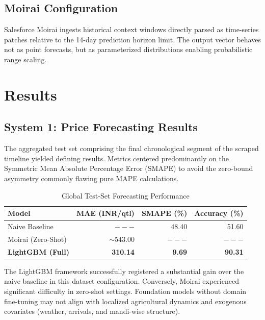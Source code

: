 \documentclass[conference]{IEEEtran}
\begin{document}
\subsection{Moirai Configuration}
Salesforce Moirai ingests historical context windows directly parsed as time-series patches relative to the 14-day prediction horizon limit. The output vector behaves not as point forecasts, but as parameterized distributions enabling probabilistic range scaling.

\section{Results}

\subsection{System 1: Price Forecasting Results}

The aggregated test set comprising the final chronological segment of the scraped timeline yielded defining results. Metrics centered predominantly on the Symmetric Mean Absolute Percentage Error (SMAPE) to avoid the zero-bound asymmetry commonly flawing pure MAPE calculations.

\begin{table}[htbp]
\caption{Global Test-Set Forecasting Performance}
\begin{center}
\begin{tabular}{lrrr}
\toprule
\textbf{Model} & \textbf{MAE (INR/qtl)} & \textbf{SMAPE (\%)} & \textbf{Accuracy (\%)} \\
\midrule
Naive Baseline       & $---$ & 48.40 & 51.60 \\
Moirai (Zero-Shot)   & $\sim 543.00$ & $---$ & $---$ \\
\textbf{LightGBM (Full)}    & \textbf{310.14} & \textbf{9.69} & \textbf{90.31} \\
\bottomrule
\end{tabular}
\label{tab:price_metrics}
\end{center}
\end{table}

The LightGBM framework successfully registered a substantial gain over the naive baseline in this dataset configuration. Conversely, Moirai experienced significant difficulty in zero-shot settings. Foundation models without domain fine-tuning may not align with localized agricultural dynamics and exogenous covariates (weather, arrivals, and mandi-wise structure).
\end{document}
